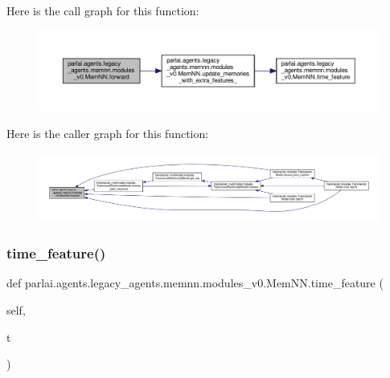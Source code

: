 Here is the call graph for this function\+:
\nopagebreak
\begin{figure}[H]
\begin{center}
\leavevmode
\includegraphics[width=350pt]{classparlai_1_1agents_1_1legacy__agents_1_1memnn_1_1modules__v0_1_1MemNN_ada4f6a93ff12e96bd84ccdefc40535bd_cgraph}
\end{center}
\end{figure}
Here is the caller graph for this function\+:
\nopagebreak
\begin{figure}[H]
\begin{center}
\leavevmode
\includegraphics[width=350pt]{classparlai_1_1agents_1_1legacy__agents_1_1memnn_1_1modules__v0_1_1MemNN_ada4f6a93ff12e96bd84ccdefc40535bd_icgraph}
\end{center}
\end{figure}
\mbox{\label{classparlai_1_1agents_1_1legacy__agents_1_1memnn_1_1modules__v0_1_1MemNN_ab1188b15b34f67153ac59258d646397b}} 
\subsubsection{\texorpdfstring{time\+\_\+feature()}{time\_feature()}}
{\footnotesize\ttfamily def parlai.\+agents.\+legacy\+\_\+agents.\+memnn.\+modules\+\_\+v0.\+Mem\+N\+N.\+time\+\_\+feature (\begin{DoxyParamCaption}\item[{}]{self,  }\item[{}]{t }\end{DoxyParamCaption})}



